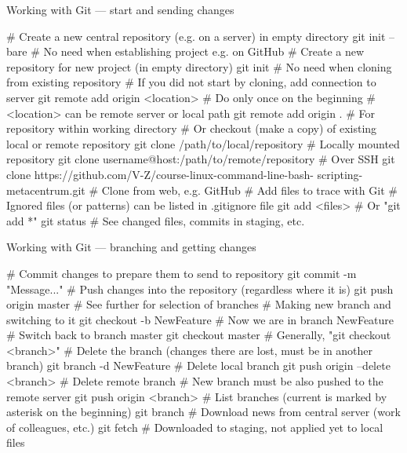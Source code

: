 \documentclass[compress, xelatex, 11pt, xcolor=svgnames, aspectratio=169,
	hyperref={
		bookmarks=true,
		unicode=true,
		colorlinks=true,
		pdftitle={Linux, command line and MetaCentrum},
		plainpages=false,
		pdfauthor={Vojtech Zeisek},
		pdfsubject={Course about use of Linux command line, writing shell scripts and using MetaCentrum of CESNET},
		pdfcreator={XeLaTeX},
		pdfkeywords={Linux, GNU, BASH, shell, command line, MetaCentrum},
		linkcolor=DarkRed, %
		anchorcolor=DarkBlue, %
		citecolor=Indigo, %
		filecolor=NavyBlue, %
		menucolor=DarkMagenta, %
		urlcolor=DarkBlue, %
		},
	url={hyphens, lowtilde} %
	]{beamer}
\begin{document}
\begin{frame}[fragile]{Working with Git --- start and sending changes}
	\begin{bashcode}
    # Create a new central repository (e.g. on a server) in empty directory
    git init --bare # No need when establishing project e.g. on GitHub
    # Create a new repository for new project (in empty directory)
    git init # No need when cloning from existing repository
    # If you did not start by cloning, add connection to server
    git remote add origin <location> # Do only once on the beginning
    # <location> can be remote server or local path
    git remote add origin . # For repository within working directory
    # Or checkout (make a copy) of existing local or remote repository
    git clone /path/to/local/repository # Locally mounted repository
    git clone username@host:/path/to/remote/repository # Over SSH
    git clone https://github.com/V-Z/course-linux-command-line-bash-
      scripting-metacentrum.git # Clone from web, e.g. GitHub
    # Add files to trace with Git
    # Ignored files (or patterns) can be listed in .gitignore file
    git add <files> # Or "git add *"
    git status # See changed files, commits in staging, etc.
	\end{bashcode}
\end{frame}

\begin{frame}[fragile]{Working with Git --- branching and getting changes}
	\begin{bashcode}
    # Commit changes to prepare them to send to repository
    git commit -m "Message..."
    # Push changes into the repository (regardless where it is)
    git push origin master # See further for selection of branches
    # Making new branch and switching to it
    git checkout -b NewFeature # Now we are in branch NewFeature
    # Switch back to branch master
    git checkout master # Generally, "git checkout <branch>"
    # Delete the branch (changes there are lost, must be in another branch)
    git branch -d NewFeature # Delete local branch
    git push origin --delete <branch> # Delete remote branch
    # New branch must be also pushed to the remote server
    git push origin <branch>
    # List branches (current is marked by asterisk on the beginning)
    git branch
    # Download news from central server (work of colleagues, etc.)
    git fetch # Downloaded to staging, not applied yet to local files
	\end{bashcode}
\end{frame}
\end{document}

